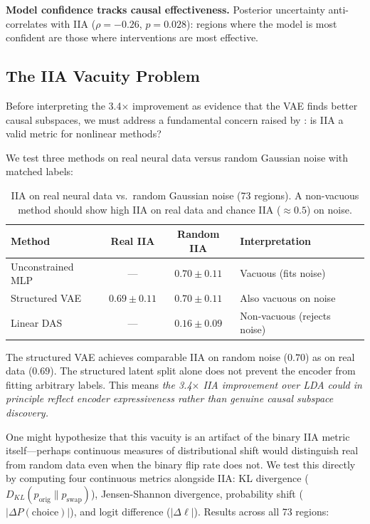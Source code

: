 \documentclass{article}
\begin{document}
\textbf{Model confidence tracks causal effectiveness.} Posterior uncertainty anti-correlates with IIA ($\rho = -0.26$, $p = 0.028$): regions where the model is most confident are those where interventions are most effective.

\subsection{The IIA Vacuity Problem}
\label{sec:vacuity}

Before interpreting the 3.4$\times$ improvement as evidence that the VAE finds better causal subspaces, we must address a fundamental concern raised by \citet{sutter2025iia}: is IIA a valid metric for nonlinear methods?

We test three methods on real neural data versus random Gaussian noise with matched labels:

\begin{table}[h]
\centering
\small
\caption{IIA on real neural data vs.\ random Gaussian noise (73 regions). A non-vacuous method should show high IIA on real data and chance IIA ($\approx 0.5$) on noise.}
\label{tab:sutter}
\begin{tabular}{lccl}
\toprule
Method & Real IIA & Random IIA & Interpretation \\
\midrule
Unconstrained MLP & --- & $0.70 \pm 0.11$ & Vacuous (fits noise) \\
Structured VAE & $0.69 \pm 0.11$ & $0.70 \pm 0.11$ & Also vacuous on noise \\
Linear DAS & --- & $0.16 \pm 0.09$ & Non-vacuous (rejects noise) \\
\bottomrule
\end{tabular}
\end{table}

The structured VAE achieves comparable IIA on random noise ($0.70$) as on real data ($0.69$). The structured latent split alone does not prevent the encoder from fitting arbitrary labels. This means \emph{the 3.4$\times$ IIA improvement over LDA could in principle reflect encoder expressiveness rather than genuine causal subspace discovery.}

One might hypothesize that this vacuity is an artifact of the binary IIA metric itself---perhaps continuous measures of distributional shift would distinguish real from random data even when the binary flip rate does not. We test this directly by computing four continuous metrics alongside IIA: KL divergence ($D_{KL}(p_{\text{orig}} \| p_{\text{swap}})$), Jensen-Shannon divergence, probability shift ($|\Delta P(\text{choice})|$), and logit difference ($|\Delta \ell|$). Results across all 73 regions:
\end{document}
